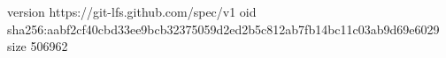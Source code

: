 version https://git-lfs.github.com/spec/v1
oid sha256:aabf2cf40cbd33ee9bcb32375059d2ed2b5c812ab7fb14bc11c03ab9d69e6029
size 506962
